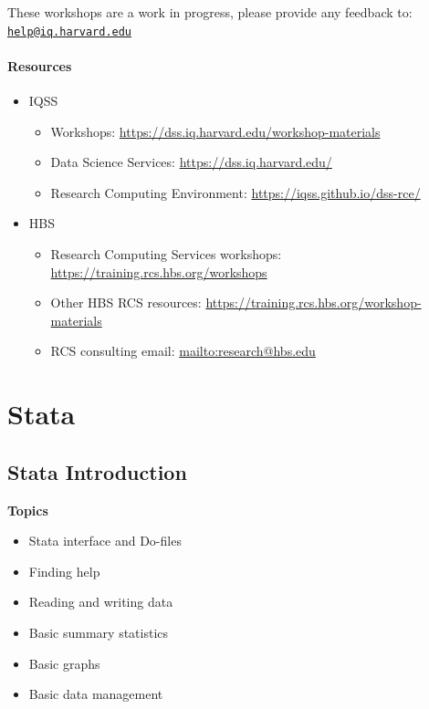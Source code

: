 \documentclass[]{book}
\providecommand{\tightlist}{%
  \setlength{\itemsep}{0pt}\setlength{\parskip}{0pt}}
\begin{document}
These workshops are a work in progress, please provide any feedback to:
\href{mailto:help@iq.harvard.edu}{\nolinkurl{help@iq.harvard.edu}}

\subsection{Resources}\label{resources-8}

\begin{itemize}
\tightlist
\item
  IQSS

  \begin{itemize}
  \tightlist
  \item
    Workshops: \url{https://dss.iq.harvard.edu/workshop-materials}
  \item
    Data Science Services: \url{https://dss.iq.harvard.edu/}
  \item
    Research Computing Environment:
    \url{https://iqss.github.io/dss-rce/}
  \end{itemize}
\item
  HBS

  \begin{itemize}
  \tightlist
  \item
    Research Computing Services workshops:
    \url{https://training.rcs.hbs.org/workshops}
  \item
    Other HBS RCS resources:
    \url{https://training.rcs.hbs.org/workshop-materials}
  \item
    RCS consulting email: \url{mailto:research@hbs.edu}
  \end{itemize}
\end{itemize}

\part{Stata}\label{part-stata}

\chapter{Stata Introduction}\label{stata-introduction}

\textbf{Topics}

\begin{itemize}
\tightlist
\item
  Stata interface and Do-files
\item
  Finding help
\item
  Reading and writing data
\item
  Basic summary statistics
\item
  Basic graphs
\item
  Basic data management
\end{itemize}
\end{document}
